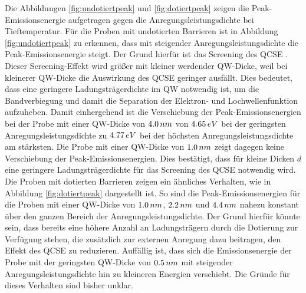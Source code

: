 \noindent 
Die Abbildungen \ref{fig:undotiertpeak} und \ref{fig:dotiertpeak} zeigen die Peak-Emissionsenergie aufgetragen gegen die Anregungsleistungsdichte bei Tieftemperatur. 
Für die Proben mit undotierten Barrieren ist in Abbildung \ref{fig:undotiertpeak} zu erkennen, dass mit steigender Anregungsleistungsdichte die Peak-Emissionsenergie steigt. Der Grund hierfür ist das Screening des QCSE \cite{doi:10.1063/1.1763211}. Dieser Screening-Effekt wird größer mit kleiner werdender QW-Dicke, weil bei kleinerer QW-Dicke die Auswirkung des QCSE geringer ausfällt. Dies bedeutet, dass eine geringere Ladungsträgerdichte im QW notwendig ist, um die Bandverbiegung und damit die Separation der Elektron- und Lochwellenfunktion aufzuheben. 
\newline
Damit einhergehend ist die Verschiebung der Peak-Emissionsenergien bei der Probe mit einer QW-Dicke von $4.0 \thinspace nm$ von $4.65 \thinspace eV$ bei der geringsten Anregungsleistungsdichte zu $4.77 \thinspace eV$ bei der höchsten Anregungsleistungsdichte am stärksten. 
\newline 
Die Probe mit einer QW-Dicke von $1.0 \thinspace nm$ zeigt dagegen keine Verschiebung der Peak-Emissionsenergien. Dies bestätigt, dass für kleine Dicken $d$ eine geringere Ladungsträgerdichte für das Screening des QCSE notwendig wird.
\newline
Die Proben mit dotierten Barrieren zeigen ein ähnliches Verhalten, wie in Abbildung \ref{fig:dotiertpeak} dargestellt ist. So sind die Peak-Emissionsenergien für die Proben mit einer QW-Dicke von 
$1.0 \thinspace nm$, $2.2 \thinspace nm$ und $4.4 \thinspace nm$ nahezu konstant über den ganzen Bereich der Anregungsleistungsdichte.
Der Grund hierfür könnte sein, dass bereits eine höhere Anzahl an Ladungsträgern durch die Dotierung zur Verfügung stehen, die zusätzlich zur externen Anregung dazu beitragen, den Effekt des QCSE zu reduzieren.
\newline
Auffällig ist, dass sich die Emissionsenergie der Probe mit der geringsten QW-Dicke von $0.5 \thinspace nm$ mit steigender Anregungsleistungsdichte hin zu kleineren Energien verschiebt. Die Gründe für dieses Verhalten sind bisher unklar.
